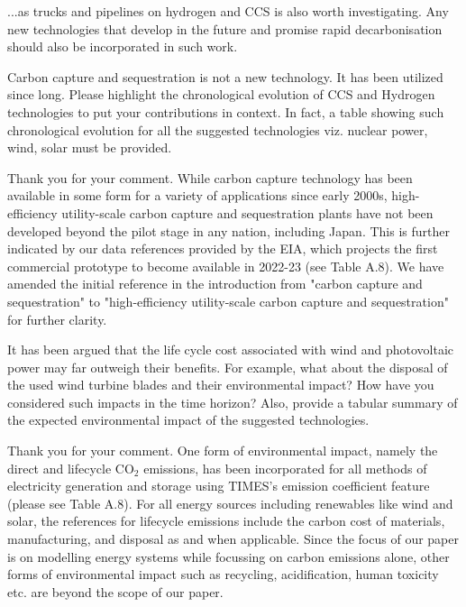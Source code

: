\documentclass[answers,11pt]{exam}
\begin{document}
\begin{questions}
\begin{solution}
                 ...as trucks and pipelines on hydrogen and CCS is also worth investigating. Any new technologies that develop in the future and promise rapid decarbonisation should also be incorporated in such work.
                 
                 
        \end{solution}
        
                \question Carbon capture and sequestration is not a new technology. It has been utilized since long. Please highlight the chronological evolution of CCS and Hydrogen technologies to put your contributions in context. In fact, a table showing such chronological evolution for all the suggested technologies viz. nuclear power, wind, solar must be provided. 
        
        \begin{solution}
                 Thank you for your comment. While carbon capture technology has been available in some form for a variety of applications since early 2000s, high-efficiency utility-scale carbon capture and sequestration plants have not been developed beyond the pilot stage in any nation, including Japan. This is further indicated by our data references provided by the EIA, which projects the first commercial prototype to become available in 2022-23 (see Table A.8). We have amended the initial reference in the introduction from "carbon capture and sequestration" to "high-efficiency utility-scale carbon capture and sequestration" for further clarity.
                 
                 
        \end{solution}
        
      
                        \question It has been argued that the life cycle cost associated with wind and photovoltaic power may far outweigh  their benefits. For example, what about the disposal of the used wind turbine blades and their environmental impact? How have you considered such impacts in the time horizon? Also, provide a tabular summary of the expected environmental impact of the suggested technologies. 
        
        \begin{solution}
        
                 Thank you for your comment. One form of environmental impact, namely the direct and lifecycle CO$_2$ emissions, has been incorporated for all methods of electricity generation and storage using TIMES's emission coefficient feature (please see Table A.8). For all energy sources including renewables like wind and solar, the references for lifecycle emissions include the carbon cost of materials, manufacturing, and disposal as and when applicable. Since the focus of our paper is on modelling energy systems while focussing on carbon emissions alone, other forms of environmental impact such as recycling, acidification, human toxicity etc. are beyond the scope of our paper.
                 

\end{solution}
\end{questions}
\end{document}
